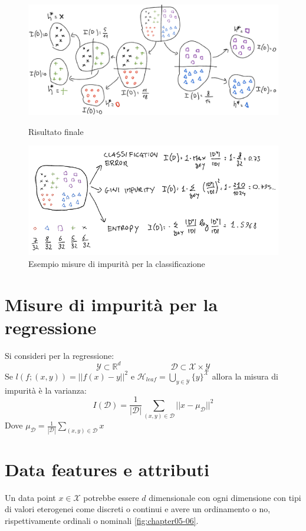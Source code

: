 \begin{figure}
	\centering
	\begin{minipage}{.5\textwidth}
		\centering
		\includegraphics[width=1\linewidth]{imgs/chapter5/img11}
		\caption{Risultato finale}
		\label{fig:chapter05-11}
	\end{minipage}%
	\begin{minipage}{.5\textwidth}
		\centering
		\includegraphics[width=1\linewidth]{imgs/chapter5/img5}
		\caption{Esempio misure di impurit\`a per la classificazione}
		\label{fig:chapter05-05}
	\end{minipage}
\end{figure}

\section{Misure di impurit\`a per la regressione}
Si consideri per la regressione:
	$$\mathcal{Y}\subset\mathbb{R}^d\qquad\qquad\qquad\mathcal{D}\subset\mathcal{X}\times\mathcal{Y}$$
Se $l(f;(x,y))=||f(x)-y||^2$ e $\mathcal{H}_{leaf} = \bigcup\limits_{y\in\mathcal{Y}}\{y\}^\mathcal{X}$ allora la misura di impurit\`a \`e la varianza:
$$I(\mathcal{D})=\dfrac{1}{|\mathcal{D}|}\sum\limits_{(x,y)\in\mathcal{D}}||x-\mu_\mathcal{D}||^2$$
Dove $\mu_\mathcal{D} = \frac{1}{|\mathcal{D}|}\sum\limits_{(x,y)\in\mathcal{D}}x$

\section{Data features e attributi}
Un data point $x\in\mathcal{X}$ potrebbe essere $d$ dimensionale con ogni dimensione con tipi di valori eterogenei come discreti o continui e avere un ordinamento o no, rispettivamente ordinali o nominali \ref{fig:chapter05-06}.

